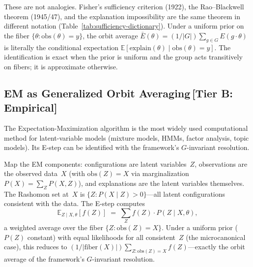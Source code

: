 \documentclass[11pt,a4paper]{article}
\newcommand{\E}{\mathbb{E}}
\begin{document}
These are not analogies.  Fisher's sufficiency criterion (1922), the
Rao--Blackwell theorem (1945/47), and the explanation impossibility are the
same theorem in different notation (Table~\ref{tab:sufficiency-dictionary}).
Under a uniform prior on the fiber $\{\theta : \mathrm{obs}(\theta) = y\}$, the orbit average $\bar{E}(\theta) = (1/|G|)\sum_{g \in G} E(g \cdot \theta)$ is literally the conditional expectation $\E[\mathrm{explain}(\theta) \mid \mathrm{obs}(\theta) = y]$.  The identification is exact when the prior is uniform and the group acts transitively on fibers; it is approximate otherwise.

\subsection{EM as Generalized Orbit Averaging\,\textnormal{\normalsize[Tier B: Empirical]}}
\label{sec:bridge-em}

The Expectation-Maximization algorithm \citep{dempster1977maximum} is the most
widely used computational method for latent-variable models (mixture models,
HMMs, factor analysis, topic models).  Its E-step can be identified with the
framework's $G$-invariant resolution.

Map the EM components: configurations are latent variables~$Z$, observations
are the observed data~$X$ (with $\mathrm{obs}(Z) = X$ via marginalization
$P(X) = \sum_Z P(X,Z)$), and explanations are the latent variables
themselves.  The Rashomon set at~$X$ is $\{Z : P(X \mid Z) > 0\}$---all
latent configurations consistent with the data.  The E-step computes
\[
  \E_{Z \mid X, \theta}[f(Z)]
  \;=\; \sum_Z f(Z) \cdot P(Z \mid X, \theta),
\]
a weighted average over the fiber $\{Z : \mathrm{obs}(Z) = X\}$.  Under a
uniform prior ($P(Z)$ constant) with equal likelihoods for all consistent~$Z$
(the microcanonical case), this reduces to $(1/|\mathrm{fiber}(X)|) \sum_{Z :
\mathrm{obs}(Z) = X} f(Z)$---exactly the orbit average of the framework's
$G$-invariant resolution.
\end{document}
